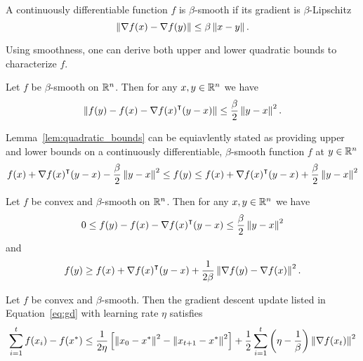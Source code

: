 \begin{definition}
    A continuously differentiable function $f$ is $\beta$-smooth if its gradient
    is $\beta$-Lipschitz
    \begin{equation}
        \left\| \nabla f(x) - \nabla f(y) \right\| \leq \beta \left\| x - y \right\|.
    \end{equation}
\end{definition}

Using smoothness, one can derive both upper and lower quadratic bounds to
characterize $f$. 

\begin{lemma}
    \label{lem:quadratic_bounds}
    Let $f$ be $\beta$-smooth on $\mathbb R^n$. Then for any $x, y \in \mathbb R^n$ we have 
    \begin{equation}
        \left\| f(y) - f(x) - \nabla {f(x)}^\intercal(y - x) \right\| \leq \frac{\beta}{2}
        \left\| y - x \right\|^2.
    \end{equation}
\end{lemma}

Lemma~\ref{lem:quadratic_bounds} can be equiavlently stated as providing upper
and lower bounds on a continuously differentiable, $\beta$-smooth function $f$
at $y \in \mathbb R^n$
\begin{equation}
    f(x) + \nabla {f(x)}^\intercal(y - x) - \frac{\beta}{2} \left\| y - x \right\|^2 \leq
    f(y) \leq
    f(x) + \nabla {f(x)}^\intercal(y - x) + \frac{\beta}{2} \left\| y - x \right\|^2
\end{equation}

\begin{lemma}
    \label{lem:con_smo}
    Let $f$ be convex and $\beta$-smooth on $\mathbb R^n$. Then for any $x, y \in \mathbb R^n$ we have
    \begin{equation}
        \label{eq:lem4_1}
        0 \leq f(y) - f(x) - \nabla {f(x)}^\intercal (y - x) \leq
        \frac{\beta}{2} \left\| y - x \right\|^2
    \end{equation}
    and
    \begin{equation}
        \label{eq:lem4_2}
        f(y) \geq f(x) + \nabla {f(x)}^\intercal (y - x) + \frac{1}{2\beta}
        \left\| \nabla f(y) - \nabla f(x) \right\|^2.
    \end{equation}
\end{lemma}

\begin{theorem}
    Let $f$ be convex and $\beta$-smooth. Then the
    gradient descent update listed in Equation~\ref{eq:gd} with learning rate
    $\eta$ satisfies
    \begin{equation}
            \sum_{i = 1}^t f(x_i) - f(x^*) \leq
        \frac{1}{2\eta}\left[\left\| x_0 - x^* \right\|^2 - \left\| x_{t+1} - x^* \right\|^2 
            \right]  + \frac{1}{2} \sum_{i = 1}^t \left(\eta - \frac{1}{\beta}\right)\left\| \nabla f(x_t) \right\|^2
    \end{equation}
\end{theorem}

